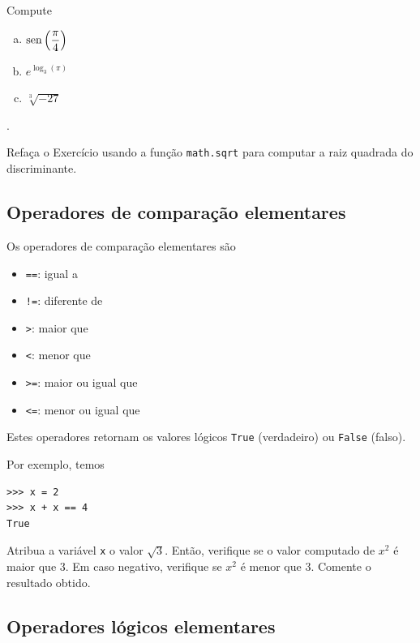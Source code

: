 \documentclass[12pt]{article}
\begin{document}
\begin{exr}
  Compute
  \begin{enumerate}[a)]
  \item $\displaystyle \operatorname{sen}\left(\frac{\pi}{4}\right)$
  \item $\displaystyle e^{\log_3(\pi)}$
  \item $\displaystyle \sqrt[3]{-27}$
  \end{enumerate}
   .
\end{exr}

\begin{exr}
  Refaça o Exercício \label{exr:bhaskara} usando a função \lstinline+math.sqrt+ para computar a raiz quadrada do discriminante.
\end{exr}


\subsection{Operadores de comparação elementares}

Os operadores de comparação elementares são
\begin{itemize}
\item[]\lstinline+==+: igual a
\item[]\lstinline+!=+: diferente de
\item[]\lstinline+>+: maior que
\item[]\lstinline+<+: menor que
\item[]\lstinline+>=+: maior ou igual que
\item[]\lstinline+<=+: menor ou igual que
\end{itemize}
Estes operadores retornam os valores lógicos \lstinline+True+ (verdadeiro) ou \lstinline+False+ (falso).

Por exemplo, temos
\begin{lstlisting}
>>> x = 2
>>> x + x == 4
True
\end{lstlisting}

\begin{exr}
  Atribua a variável \lstinline+x+ o valor $\sqrt{3}$. Então, verifique se o valor computado de $x^2$ é maior que $3$. Em caso negativo, verifique se $x^2$ é menor que 3. Comente o resultado obtido.
\end{exr}

\subsection{Operadores lógicos elementares}
\end{document}
